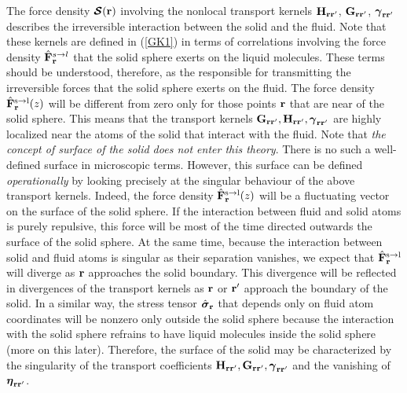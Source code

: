\documentclass[b5paper,openright,10pt]{book}
\begin{document}
The  force  density  $\boldsymbol{{\cal S}}({\bf  r})$  involving  the
nonlocal transport  kernels ${\bf H}_{{\bf r}{\bf  r}'}$, ${\bf G}_{{\bf r}{\bf r}'}$, 
$\boldsymbol{\gamma}_{{\bf  r}{\bf r}'}$ describes the
irreversible interaction between  the solid and the  fluid.  Note that
these  kernels are  defined  in (\ref{GK1})  in  terms of  correlations
involving the  force density $\hat{\bf  F}^{s\to l}_{\bf r}$  that the
solid sphere  exerts on the  liquid molecules.  These terms  should be
understood,  therefore,  as  the   responsible  for  transmitting  the
irreversible  forces that  the solid  sphere exerts  on the  fluid. The
force density $\hat{\bf F}^{\rm s\to  l}_{\bf r}(z)$ will be different
from zero only for  those points ${\bf r}$ that are  near of the solid
sphere.  This means  that the transport kernels  ${\bf G}_{{\bf r}{\bf
    r}'},{\bf  H}_{{\bf  r}{\bf r}'},\boldsymbol{\gamma}_{{\bf  r}{\bf
    r}'}$  are highly  localized  near  the atoms  of  the solid  that
interact with the  fluid.  Note that  \textit{the concept of
  surface of the solid does not  enter this theory}.  There is no such
a well-defined  surface in  microscopic terms.  However,  this surface
can  be defined  \textit{operationally}  by looking  precisely at  the
singular behaviour of the above  transport kernels.  Indeed, the force
density $\hat{\bf  F}^{\rm s\to l}_{\bf  r}(z)$ will be  a fluctuating
vector on the surface of the solid sphere.  If the interaction between
fluid and solid atoms is purely  repulsive, this force will be most of
the time  directed outwards the surface  of the solid sphere.   At the
same time,  because the interaction  between solid and fluid  atoms is
singular  as  their  separation  vanishes, we  expect  that  $\hat{\bf
  F}_{\bf r}^{\rm  s\to l}$ will  diverge as ${\bf r}$  approaches the
solid boundary.  This  divergence will be reflected  in divergences of
the  transport kernels  as  ${\bf  r}$ or  ${\bf  r}  '$ approach  the
boundary  of  the  solid.   In   a  similar  way,  the  stress  tensor
$\hat{\boldsymbol{\sigma}}_{\bf r}$  that depends  only on  fluid atom
coordinates will be nonzero only outside the solid sphere because the
interaction with  the solid sphere  refrains to have  liquid molecules
inside the solid sphere (more  on this later).  Therefore, the surface
of the solid may be characterized  by the singularity of the transport
coefficients   ${\bf  H}_{{\bf   r}{\bf   r}'},{\bf  G}_{{\bf   r}{\bf
    r}'},\boldsymbol{\gamma}_{{\bf r}{\bf  r}'}$ and the  vanishing of
$\boldsymbol{\eta}_{{\bf r}{\bf r}'}$.
\end{document}
